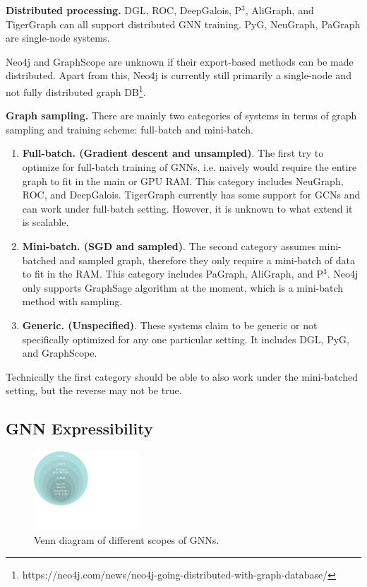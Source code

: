 \vspace{2mm}
\noindent \textbf{Distributed processing.} DGL, ROC, DeepGalois, P$^{3}$, AliGraph, and TigerGraph can all support distributed GNN training. PyG, NeuGraph, PaGraph are single-node systems.

Neo4j and GraphScope are unknown if their export-based methods can be made distributed. Apart from this, Neo4j is currently still primarily a single-node and not fully distributed graph DB\footnote{https://neo4j.com/news/neo4j-going-distributed-with-graph-database/}.

\vspace{2mm}
\noindent \textbf{Graph sampling.} 
There are mainly two categories of systems in terms of graph sampling and training scheme: full-batch and mini-batch.
\begin{enumerate}
\item \textbf{Full-batch. (Gradient descent and unsampled)}.
The first try to optimize for full-batch training of GNNs, i.e. naively would require the entire graph to fit in the main or GPU RAM. This category includes NeuGraph, ROC, and DeepGalois. TigerGraph currently has some support for GCNs and can work under full-batch setting. However, it is unknown to what extend it is scalable.
\item \textbf{Mini-batch. (SGD and sampled)}. The second category assumes mini-batched and sampled graph, therefore they only require a mini-batch of data to fit in the RAM. This category includes PaGraph, AliGraph, and P$^{3}$. Neo4j only supports GraphSage algorithm at the moment, which is a mini-batch method with sampling. 
\item \textbf{Generic. (Unspecified)}. These systems claim to be generic or not specifically optimized for any one particular setting. It includes DGL, PyG, and GraphScope.
\end{enumerate}
Technically the first category should be able to also work under the mini-batched setting, but the reverse may not be true.  


\subsection{GNN Expressibility}
\begin{figure}[t]
 \centering
\includegraphics[width=0.35\textwidth]{./images/venn_diagram.pdf}
 \caption{Venn diagram of different scopes of GNNs.}
 \label{fig:venn}
\end{figure}


